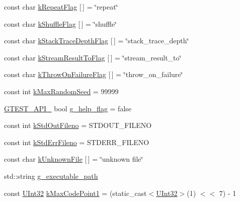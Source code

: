 \begin{DoxyCompactItemize}
\item 
const char \hyperlink{namespacetesting_1_1internal_a764ee423d39ebb8e10c53ab9b685cd9b}{k\+Repeat\+Flag} \mbox{[}$\,$\mbox{]} = \char`\"{}repeat\char`\"{}
\item 
const char \hyperlink{namespacetesting_1_1internal_affd2c1118505cb97d8ff728c95fc722b}{k\+Shuffle\+Flag} \mbox{[}$\,$\mbox{]} = \char`\"{}shuffle\char`\"{}
\item 
const char \hyperlink{namespacetesting_1_1internal_ad6f90e66d431ca3a9084408878c2cc77}{k\+Stack\+Trace\+Depth\+Flag} \mbox{[}$\,$\mbox{]} = \char`\"{}stack\+\_\+trace\+\_\+depth\char`\"{}
\item 
const char \hyperlink{namespacetesting_1_1internal_a84f8a2102d45c8b2b35be06d14ffefb8}{k\+Stream\+Result\+To\+Flag} \mbox{[}$\,$\mbox{]} = \char`\"{}stream\+\_\+result\+\_\+to\char`\"{}
\item 
const char \hyperlink{namespacetesting_1_1internal_ad9efcf363de3483afd91c7393a4fefb8}{k\+Throw\+On\+Failure\+Flag} \mbox{[}$\,$\mbox{]} = \char`\"{}throw\+\_\+on\+\_\+failure\char`\"{}
\item 
const int \hyperlink{namespacetesting_1_1internal_a41bd421ace53d23dbe85d9618c3afaee}{k\+Max\+Random\+Seed} = 99999
\item 
\hyperlink{gtest-port_8h_aa73be6f0ba4a7456180a94904ce17790}{G\+T\+E\+S\+T\+\_\+\+A\+P\+I\+\_\+} bool \hyperlink{namespacetesting_1_1internal_a93a772f5e51973b105d91cbb66a203f4}{g\+\_\+help\+\_\+flag} = false
\item 
const int \hyperlink{namespacetesting_1_1internal_a24f0a3d50cac54a9132f4828ec9b96d9}{k\+Std\+Out\+Fileno} = S\+T\+D\+O\+U\+T\+\_\+\+F\+I\+L\+E\+N\+O
\item 
const int \hyperlink{namespacetesting_1_1internal_a747eccfdbdee3ff8af3bedc476a57c85}{k\+Std\+Err\+Fileno} = S\+T\+D\+E\+R\+R\+\_\+\+F\+I\+L\+E\+N\+O
\item 
const char \hyperlink{namespacetesting_1_1internal_abae7a5775c901f2fd12b058b00d09840}{k\+Unknown\+File} \mbox{[}$\,$\mbox{]} = \char`\"{}unknown file\char`\"{}
\item 
std\+::string \hyperlink{namespacetesting_1_1internal_a378aeb636e57d85615c466189e84417b}{g\+\_\+executable\+\_\+path}
\item 
const \hyperlink{namespacetesting_1_1internal_a40d4fffcd2bf56f18b1c380615aa85e3}{U\+Int32} \hyperlink{namespacetesting_1_1internal_a128515c8ed6c0fe98e498c8042da2060}{k\+Max\+Code\+Point1} = (static\+\_\+cast$<$\hyperlink{namespacetesting_1_1internal_a40d4fffcd2bf56f18b1c380615aa85e3}{U\+Int32}$>$(1) $<$$<$ 7) -\/ 1
$$
\end{DoxyCompactItemize}
